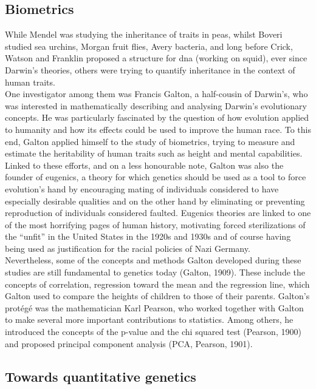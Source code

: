 \subsection{Biometrics} %
While Mendel was studying the inheritance of traits in peas, whilst Boveri studied sea urchins, Morgan fruit flies, Avery bacteria, and long before Crick, Watson and Franklin proposed a structure for \gls{dna} (working on squid), ever since Darwin’s theories, others were trying to quantify inheritance in the context of human traits.\\ 

One investigator among them was Francis Galton, a half-cousin of Darwin’s, who was interested in mathematically describing and analysing Darwin’s evolutionary concepts. 
He was particularly fascinated by the question of how evolution applied to humanity and how its effects could be used to improve the human race. 
To this end, Galton applied himself to the study of biometrics, trying to measure and estimate the heritability of human traits such as height and mental capabilities.\\ 

Linked to these efforts, and on a less honourable note, Galton was also the founder of eugenics, a theory for which genetics should be used as a tool to force evolution’s hand by encouraging mating of individuals considered to have especially desirable qualities and on the other hand by eliminating or preventing reproduction of individuals considered faulted. Eugenics theories are linked to one of the most horrifying pages of human history, motivating forced sterilizations of the “unfit” in the United States in the 1920s and 1930s and of course having being used as justification for the racial policies of Nazi Germany.\\ 

Nevertheless, some of the concepts and methods Galton developed during these studies are still fundamental to genetics today (Galton, 1909). 
These include the concepts of correlation, regression toward the mean and the regression line, which Galton used to compare the heights of children to those of their parents. Galton’s protégé was the mathematician Karl Pearson, who worked together with Galton to make several more important contributions to statistics. Among others, he introduced the concepts of the p-value and the chi squared test (Pearson, 1900) and proposed principal component analysis (PCA, Pearson, 1901).

\subsection{Towards quantitative genetics} %

